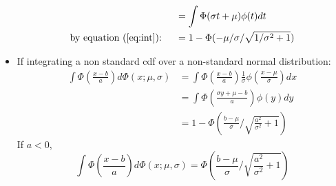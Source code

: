 \documentclass[12pt]{article}
\begin{document}
\begin{itemize}
\begin{align*}
    & = \int \Phi(\sigma t + \mu)\phi(t) dt \\
    \text{by equation (\ref{eq:int}): } \quad & = 1 -
    \Phi(-\mu/\sigma/\sqrt{1/\sigma^2+1})
  \end{align*}
\item If integrating a non standard cdf over a non-standard normal
  distribution:
  \begin{align}
    \int \Phi \left( \frac{x-b}{a} \right) d\Phi(x; \mu, \sigma) & = \int \Phi \left( \frac{x-b}{a} \right) \frac{1}{\sigma} \phi \left( \frac{x-\mu}{\sigma} \right) dx \nonumber\\
    &= \int \Phi \left( \frac{\sigma y + \mu - b}{a}  \right) \phi(y) dy \nonumber \\
    \label{eq:intg1}
    & = 1- \Phi \left( \frac{b-\mu}{\sigma} /
      \sqrt{\frac{a^2}{\sigma^2}+1} \right)
  \end{align}
  If $a < 0$,
  \begin{equation}
    \label{eq:intg2}
    \int \Phi \left( \frac{x-b}{a} \right) d\Phi(x; \mu, \sigma) = \Phi \left( \frac{b-\mu}{\sigma} / \sqrt{\frac{a^2}{\sigma^2}+1} \right)
  \end{equation}

\end{itemize}
\end{document}

